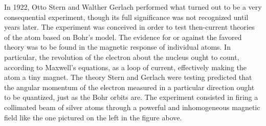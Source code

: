 \begin{figure}[!ht]
     \hfill
\end{figure}

In 1922, Otto Stern and Walther Gerlach performed what turned out to be a very consequential experiment, though its full significance was not recognized until years later. The experiment was conceived in order to test then-current theories of the atom based on Bohr's model. The evidence for or against the favored theory was to be found in the magnetic response of individual atoms. In particular, the revolution of the electron about the nucleus ought to count, according to Maxwell's equations, as a loop of current, effectively making the atom a tiny magnet. The theory Stern and Gerlach were testing predicted that the angular momentum of the electron measured in a particular direction ought to be quantized, just as the Bohr orbits are. The experiment consisted in firing a collimated beam of silver atoms through a powerful and inhomogeneous magnetic field like the one pictured on the left in the figure above.


